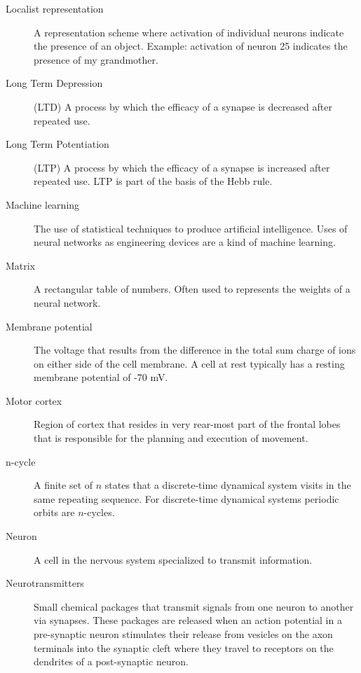 \begin{description}
\item[Localist representation] A representation scheme where activation of individual neurons indicate the presence of an object. Example: activation of neuron 25 indicates the presence of my grandmother.

\item[Long Term Depression] (LTD) A  process by which the efficacy of a synapse is decreased after repeated use.

\item[Long Term Potentiation] (LTP) A process by which the efficacy of a synapse is increased after repeated use. LTP is part of the basis of the Hebb rule.

\item[Machine learning] The use of statistical techniques to produce artificial intelligence. Uses of neural networks as engineering devices are a kind of machine learning.

\item[Matrix] A rectangular table of numbers. Often used to represents the 
weights of a neural network.

\item[Membrane potential] The voltage that results from the difference in the total sum charge of ions on either side of the cell membrane. A cell at rest typically has a resting membrane potential of -70 mV. 


\item[Motor cortex] Region of cortex that resides in very rear-most part of the frontal lobes that is responsible for the planning and execution of movement. 

\item[n-cycle] A finite set of $n$ states that a discrete-time dynamical system visits in the same repeating sequence. For discrete-time dynamical systems periodic orbits are $n$-cycles.

\item[Neuron] A cell in the nervous system specialized to transmit information.

\item[Neurotransmitters] Small chemical packages that transmit signals from one neuron to another via synapses. These packages are released when an action potential in a pre-synaptic neuron stimulates their release from vesicles on the axon terminals into the synaptic cleft where they travel to receptors on the dendrites of a post-synaptic neuron. 


\end{description}
